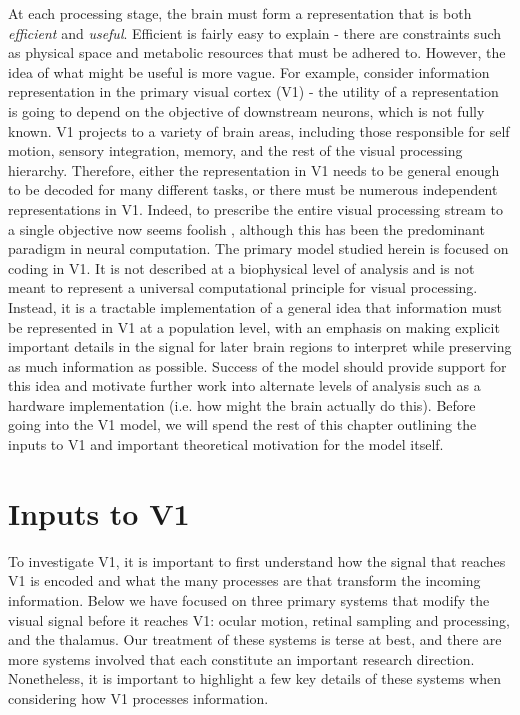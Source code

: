 At each processing stage, the brain must form a representation that is both \textit{efficient} and \textit{useful}. Efficient is fairly easy to explain - there are constraints such as physical space and metabolic resources that must be adhered to. However, the idea of what might be useful is more vague. For example, consider information representation in the primary visual cortex (V1) - the utility of a representation is going to depend on the objective of downstream neurons, which is not fully known. V1 projects to a variety of brain areas, including those responsible for self motion, sensory integration, memory, and the rest of the visual processing hierarchy. Therefore, either the representation in V1 needs to be general enough to be decoded for many different tasks, or there must be numerous independent representations in V1. Indeed, to prescribe the entire visual processing stream to a single objective now seems foolish \parencite{barlow2001redundancy}, although this has been the predominant paradigm in neural computation. The primary model studied herein is focused on coding in V1. It is not described at a biophysical level of analysis and is not meant to represent a universal computational principle for visual processing. Instead, it is a tractable implementation of a general idea that information must be represented in V1 at a population level, with an emphasis on making explicit important details in the signal for later brain regions to interpret while preserving as much information as possible. Success of the model should provide support for this idea and motivate further work into alternate levels of analysis such as a hardware implementation (i.e. how might the brain actually do this). Before going into the V1 model, we will spend the rest of this chapter outlining the inputs to V1 and important theoretical motivation for the model itself.


\section{Inputs to V1}
To investigate V1, it is important to first understand how the signal that reaches V1 is encoded and what the many processes are that transform the incoming information. Below we have focused on three primary systems that modify the visual signal before it reaches V1: ocular motion, retinal sampling and processing, and the thalamus. Our treatment of these systems is terse at best, and there are more systems involved that each constitute an important research direction. Nonetheless, it is important to highlight a few key details of these systems when considering how V1 processes information.


